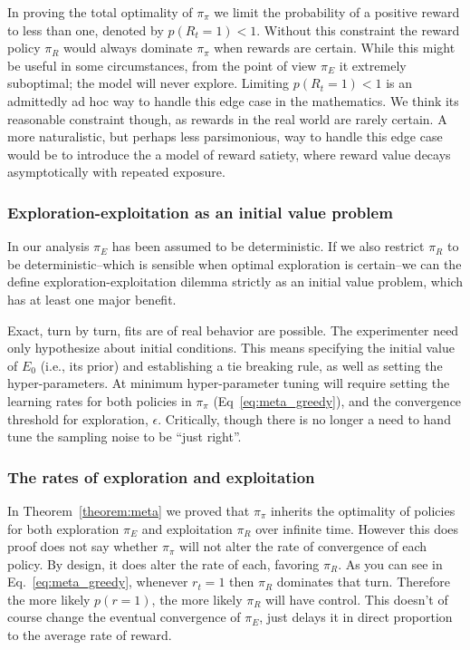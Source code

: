\documentclass[9pt,twocolumn,twoside]{pnas-new}
\begin{document}
In proving the total optimality of $\pi_{\pi}$ we limit the probability of a positive reward to less than one, denoted by $p(R_t = 1) < 1$. Without this constraint the reward policy $\pi_R$ would always dominate $\pi_{\pi}$ when rewards are certain. While this might be useful in some circumstances, from the point of view $\pi_E$ it extremely suboptimal; the model will never explore. Limiting $p(R_t = 1) < 1$ is an admittedly ad hoc way to handle this edge case in the mathematics. We think its reasonable constraint though, as rewards in the real world are rarely certain. A more naturalistic, but perhaps less parsimonious, way to handle this edge case would be to introduce the a model of reward satiety, where reward value decays asymptotically with repeated exposure. 

\subsubsection*{Exploration-exploitation as an initial value problem}
In our analysis $\pi_E$ has been assumed to be deterministic. If we also restrict $\pi_R$ to be deterministic--which is sensible when optimal exploration is certain--we can the define exploration-exploitation dilemma strictly as an initial value problem, which has at least one major benefit.

Exact, turn by turn, fits are of real behavior are possible. The experimenter need only hypothesize about initial conditions. This means specifying the initial value of $E_0$ (i.e., its prior) and establishing a tie breaking rule, as well as setting the hyper-parameters. At minimum hyper-parameter tuning will require setting the learning rates for both policies in $\pi_{\pi}$ (Eq~\ref{eq:meta_greedy}), and the convergence threshold for exploration, $\epsilon$. Critically, though there is no longer a need to hand tune the sampling noise to be ``just right''. %


\subsubsection*{The rates of exploration and exploitation}
In Theorem~\ref{theorem:meta} we proved that $\pi_{\pi}$ inherits the optimality of policies for both exploration $\pi_E$ and exploitation $\pi_R$ over infinite time. However this does proof does not say whether $\pi_{\pi}$ will not alter the rate of convergence of each policy. By design, it does alter the rate of each, favoring $\pi_R$. As you can see in Eq.~\ref{eq:meta_greedy}, whenever $r_t = 1$ then $\pi_R$ dominates that turn. Therefore the more likely $p(r=1)$, the more likely $\pi_R$ will have control. This doesn't of course change the eventual convergence of $\pi_E$, just delays it in direct proportion to the average rate of reward.
\end{document}
